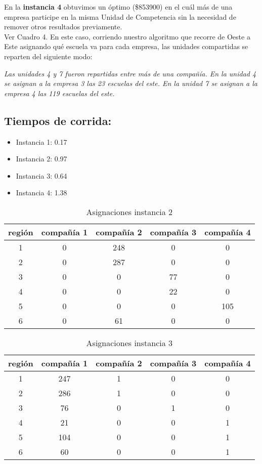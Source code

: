 \documentclass[12pt]{article}
\begin{document}
\bigskip


En la \textbf{instancia 4} obtuvimos un óptimo (\$853900) en el cuál más de una empresa participe en la misma Unidad de Competencia sin la necesidad de remover otros resultados previamente. 
\\Ver Cuadro 4.
En este caso, corriendo nuestro algoritmo que recorre de Oeste a Este asignando qué escuela va para cada empresa, las unidades compartidas se reparten del siguiente modo:

\textit{Las unidades 4 y 7 fueron repartidas entre más de una compañía. En la unidad 4 se asignan a la empresa 3 las 23 escuelas del este. En la unidad 7 se asignan a la empresa 4 las 119 escuelas del este.}
\subsection{Tiempos de corrida:}

\begin{itemize}
    \item Instancia 1: 0.17
    \item Instancia 2: 0.97
    \item Instancia 3: 0.64
    \item Instancia 4: 1.38
\end{itemize}



\begin{table}[h!]
\centering
\begin{tabular}{||c|| c | c | c | c||} 
 \hline
     región & compañía 1 & compañía 2 & compañía 3 & compañía 4 \\ [0.5ex] 
 \hline\hline
 1 & 0 & 248 & 0 & 0 \\ 
 2 & 0 & 287 & 0 & 0 \\
 3 & 0 & 0 & 77 & 0 \\
 4 & 0 & 0 & 22 & 0 \\
 5 & 0 & 0 & 0 & 105 \\
 6 & 0 & 61 & 0 & 0 \\
 [1ex] 
 \hline
\end{tabular}
\caption{Asignaciones instancia 2}
\label{table:1}
\end{table}


\begin{table}[h!]
\centering
\begin{tabular}{||c|| c | c | c | c||} 
 \hline
     región & compañía 1 & compañía 2 & compañía 3 & compañía 4 \\ [0.5ex] 
 \hline\hline
 1 & 247 & 1 & 0 & 0 \\ 
 2 & 286 & 1 & 0 & 0 \\
 3 & 76 & 0 & 1 & 0 \\
 4 & 21 & 0 & 0 & 1 \\
 5 & 104  & 0 & 0 & 1 \\
 6 & 60 & 0 & 0 & 1 \\
 [1ex] 
 \hline
\end{tabular}
\caption{Asignaciones instancia 3}
\label{table:1}
\end{table}
\end{document}
